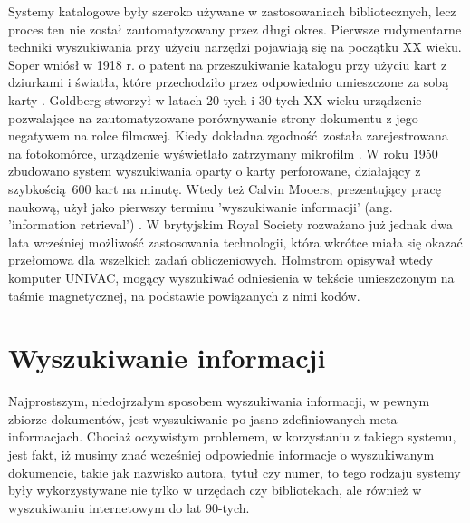 Systemy katalogowe były szeroko używane w zastosowaniach bibliotecznych, lecz proces ten nie został zautomatyzowany przez długi okres. Pierwsze rudymentarne techniki wyszukiwania przy użyciu narzędzi pojawiają się na początku XX wieku. Soper wniósł w 1918 r. o patent na przeszukiwanie katalogu przy użyciu kart z dziurkami i światła, które przechodziło przez odpowiednio umieszczone za sobą karty \autocite{sandersoncroft2012}. Goldberg stworzył w latach 20-tych i 30-tych XX wieku urządzenie pozwalające na zautomatyzowane porównywanie strony dokumentu z jego negatywem na rolce filmowej. Kiedy dokładna zgodność została zarejestrowana na fotokomórce, urządzenie wyświetlało zatrzymany mikrofilm \autocite{sandersoncroft2012}. W roku 1950 zbudowano system wyszukiwania oparty o karty perforowane, działający z szybkością 600 kart na minutę. Wtedy też Calvin Mooers, prezentujący pracę naukową, użył jako pierwszy terminu 'wyszukiwanie informacji' (ang. 'information retrieval') \autocite{sandersoncroft2012}. W brytyjskim Royal Society rozważano już jednak dwa lata wcześniej możliwość zastosowania technologii, która wkrótce miała się okazać przełomowa dla wszelkich zadań obliczeniowych. Holmstrom opisywał wtedy komputer UNIVAC, mogący wyszukiwać odniesienia w tekście umieszczonym na taśmie magnetycznej, na podstawie powiązanych z nimi kodów\autocite{sandersoncroft2012}. \newline

\section{Wyszukiwanie informacji}

Najprostszym, niedojrzałym sposobem wyszukiwania informacji, w pewnym zbiorze dokumentów, jest wyszukiwanie po jasno zdefiniowanych meta-informacjach. Chociaż oczywistym problemem, w korzystaniu z takiego systemu, jest fakt, iż musimy znać wcześniej odpowiednie informacje o wyszukiwanym dokumencie, takie jak nazwisko autora, tytuł czy numer, to tego rodzaju systemy były wykorzystywane nie tylko w urzędach czy bibliotekach, ale również w wyszukiwaniu internetowym do lat 90-tych.\newline

